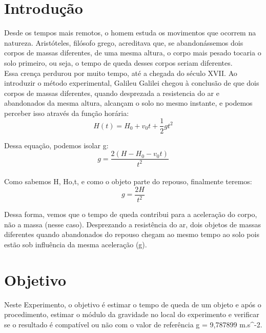 \documentclass[11pt, letterpaper]{article}
\begin{document}
\newpage
\listoftables
\newpage
\section{Introdução}
Desde os tempos mais remotos, o homem estuda os movimentos que ocorrem na natureza. Aristóteles, filósofo grego, acreditava que, se abandonássemos dois corpos de massas diferentes, de uma mesma altura, o corpo mais pesado tocaria o solo primeiro, ou seja, o tempo de queda desses corpos seriam diferentes. \\
Essa crença perdurou por muito tempo, até a chegada do século XVII. Ao introduzir o método experimental, Galileu Galilei chegou à conclusão de que dois corpos de massas diferentes, quando desprezada a resistencia do ar e abandonados da mesma altura, alcançam o solo no mesmo instante, e podemos perceber isso através da função horária: \\
$$ H(t) = H_{0} + v_{0}t + \frac{1}{2}gt^2 $$

Dessa equação, podemos isolar g: \\
\textbf{$$g = \frac{2(H - H_{0} - v_{0}t)}{t^2}$$} \\
Como sabemos H, Ho,t, e como o objeto parte do repouso, finalmente teremos: \\

$$ g = \frac{2H}{t^2} $$

Dessa forma, vemos que o tempo de queda contribui para a aceleração do corpo, não a massa (nesse caso). Desprezando a resistência do ar, dois objetos de massas diferentes quando abandonados do repouso chegam ao mesmo tempo ao solo pois estão sob influência da mesma aceleração (g).

\section{Objetivo}

Neste Experimento, o objetivo é estimar o tempo de queda de um objeto e após o procedimento, estimar o módulo da gravidade no local do experimento e verificar se o resultado é compatível ou não com o valor de referência g = 9,787899 m.s^{-2}.


\end{document}
